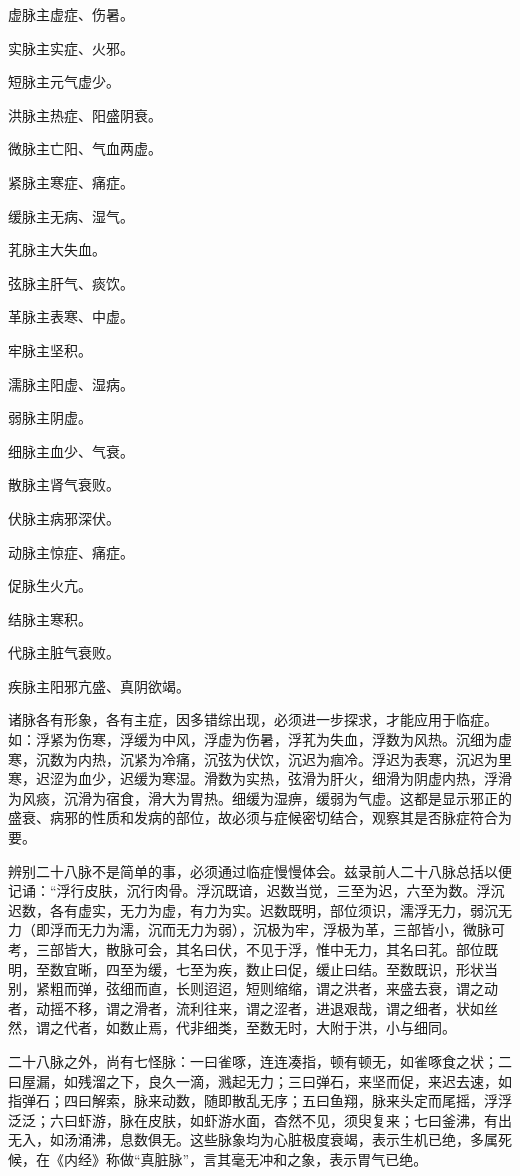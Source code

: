 \documentclass[a4paper,12pt,UTF8,twoside]{ctexbook}
\begin{document}
虚脉主虚症、伤暑。

实脉主实症、火邪。

短脉主元气虚少。

洪脉主热症、阳盛阴衰。

微脉主亡阳、气血两虚。

紧脉主寒症、痛症。

缓脉主无病、湿气。

芤脉主大失血。

弦脉主肝气、痰饮。

革脉主表寒、中虚。

牢脉主坚积。

濡脉主阳虚、湿病。

弱脉主阴虚。

细脉主血少、气衰。

散脉主肾气衰败。

伏脉主病邪深伏。

动脉主惊症、痛症。

促脉生火亢。

结脉主寒积。

代脉主脏气衰败。

疾脉主阳邪亢盛、真阴欲竭。

诸脉各有形象，各有主症，因多错综出现，必须进一步探求，才能应用于临症。如：浮紧为伤寒，浮缓为中风，浮虚为伤暑，浮芤为失血，浮数为风热。沉细为虚寒，沉数为内热，沉紧为冷痛，沉弦为伏饮，沉迟为痼冷。浮迟为表寒，沉迟为里寒，迟涩为血少，迟缓为寒湿。滑数为实热，弦滑为肝火，细滑为阴虚内热，浮滑为风痰，沉滑为宿食，滑大为胃热。细缓为湿痹，缓弱为气虚。这都是显示邪正的盛衰、病邪的性质和发病的部位，故必须与症候密切结合，观察其是否脉症符合为要。

辨别二十八脉不是简单的事，必须通过临症慢慢体会。兹录前人二十八脉总括以便记诵：“浮行皮肤，沉行肉骨。浮沉既谙，迟数当觉，三至为迟，六至为数。浮沉迟数，各有虚实，无力为虚，有力为实。迟数既明，部位须识，濡浮无力，弱沉无力（即浮而无力为濡，沉而无力为弱），沉极为牢，浮极为革，三部皆小，微脉可考，三部皆大，散脉可会，其名曰伏，不见于浮，惟中无力，其名曰芤。部位既明，至数宜晰，四至为缓，七至为疾，数止曰促，缓止曰结。至数既识，形状当别，紧粗而弹，弦细而直，长则迢迢，短则缩缩，谓之洪者，来盛去衰，谓之动者，动摇不移，谓之滑者，流利往来，谓之涩者，进退艰哉，谓之细者，状如丝然，谓之代者，如数止焉，代非细类，至数无时，大附于洪，小与细同。

二十八脉之外，尚有七怪脉：一曰雀啄，连连凑指，顿有顿无，如雀啄食之状；二曰屋漏，如残溜之下，良久一滴，溅起无力；三曰弹石，来坚而促，来迟去速，如指弹石；四曰解索，脉来动数，随即散乱无序；五曰鱼翔，脉来头定而尾摇，浮浮泛泛；六曰虾游，脉在皮肤，如虾游水面，杳然不见，须臾复来；七曰釜沸，有出无入，如汤涌沸，息数俱无。这些脉象均为心脏极度衰竭，表示生机已绝，多属死候，在《内经》称做“真脏脉”，言其毫无冲和之象，表示胃气已绝。
\end{document}
